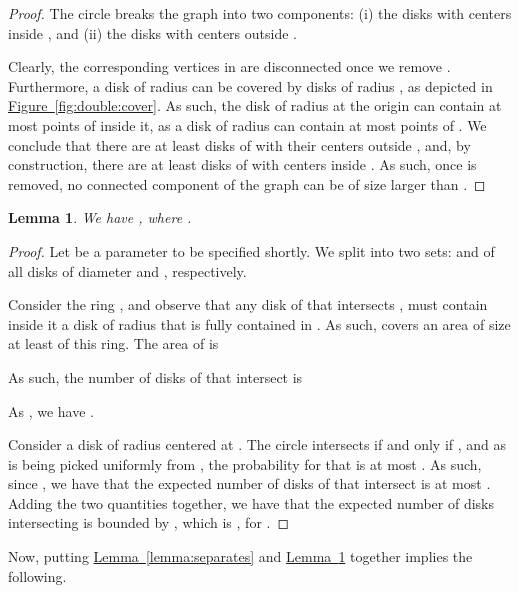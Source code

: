 \documentclass[12pt]{article}
\newtheorem{lemma}[theorem]{Lemma}
\theoremstyle{remark}\theoremheaderfont{\sf}\theorembodyfont{\upshape}\newtheorem{defn}[theorem]{Definition}
\newcommand{\HLink}[2]{\hyperref[#2]{#1~\ref*{#2}}}
\newcommand{\lemlab}[1]{\label{lemma:#1}}
\newcommand{\lemref}[1]{\HLink{Lemma}{lemma:#1}}
\newcommand{\figlab}[1]{\label{fig:#1}}
\newcommand{\figref}[1]{\HLink{Figure}{fig:#1}}
\newcommand{\PPicCapLab}[4][]{
   \settowidth{\ppicwd}{\texttt{[image: \{\#2]}}} \begin{minipage}{\ppicwd}
       {\texttt{[image: \{\#2]}}}\vspace{-0.3cm}\captionof{figure}{}
       \figlab{#4}
   \end{minipage}}
\newlength{\ppicwd}
\begin{document}
\begin{proof}
    The circle  breaks the graph into two components: (i) the
    disks with centers inside , and (ii) the disks with centers
    outside .

    \parpic[r]{\PPicCapLab[scale=0.97]{figs/double}{}{double:cover}}

    Clearly, the corresponding vertices in  are disconnected
    once we remove . Furthermore, a disk of radius  can be
    covered by  disks of radius , as depicted in
    \figref{double:cover}. As such, the disk of radius  at the
    origin can contain at most  points of  inside it,
    as a disk of radius  can contain at most  points of
    . We conclude that there are at least  disks of
     with their centers outside , and, by construction,
    there are at least  disks of  with centers inside
    . As such, once  is removed, no connected component of the
    graph  can be of size larger than .
\end{proof}


\begin{lemma}
    \lemlab{small}We have , where
    .
\end{lemma}

\begin{proof}
    Let  be a parameter to be specified shortly. We split
     into two sets:  and  of all disks
    of diameter  and , respectively.


    Consider the ring
    , and
    observe that any disk  of  that intersects
    , must contain inside it a disk of radius  that is
    fully contained in . As such,  covers an area of size
    at least  of this ring. The area of 
    is
    
    As such, the number of disks of  that intersect 
    is
    
    As , we have .

    Consider a disk  of radius  centered
    at .  The circle  intersects  if and only
    if , and as 
    is being picked uniformly from , the probability for that
    is at most .  As such, since
    , we have that the expected number of
    disks of  that intersect  is at most .
    Adding the two quantities together, we have that the expected
    number of disks intersecting  is bounded by
    , which is , for
    .
\end{proof}

Now, putting \lemref{separates} and \lemref{small} together implies
the following.
\end{document}

